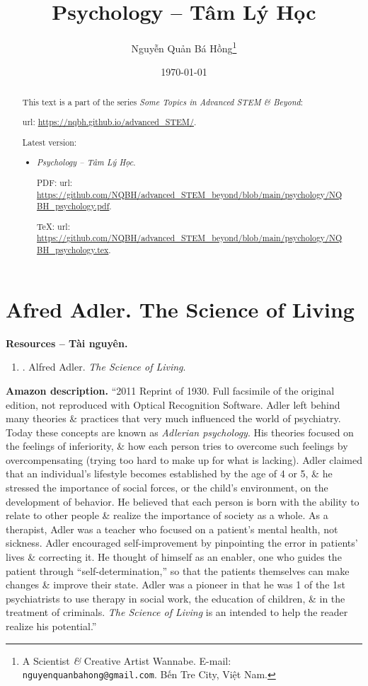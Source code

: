 \documentclass{article}
\title{Psychology -- Tâm Lý Học}
\author{Nguyễn Quản Bá Hồng\footnote{A Scientist {\it\&} Creative Artist Wannabe. E-mail: {\tt nguyenquanbahong@gmail.com}. Bến Tre City, Việt Nam.}}
\date{\today}
\begin{document}
\maketitle
\begin{abstract}
	This text is a part of the series {\it Some Topics in Advanced STEM \& Beyond}:
	
	{\sc url}: \url{https://nqbh.github.io/advanced_STEM/}.
	
	Latest version:
	\begin{itemize}
		\item {\it Psychology -- Tâm Lý Học}.
		
		PDF: {\sc url}: \url{https://github.com/NQBH/advanced_STEM_beyond/blob/main/psychology/NQBH_psychology.pdf}.
		
		\TeX: {\sc url}: \url{https://github.com/NQBH/advanced_STEM_beyond/blob/main/psychology/NQBH_psychology.tex}.
	\end{itemize}
\end{abstract}
\tableofcontents


\section{Afred Adler. The Science of Living}
\textbf{\textsf{Resources -- Tài nguyên.}}
\begin{enumerate}
	\item \cite{Adler_science_living}. {\sc Alfred Adler}. {\it The Science of Living}.
\end{enumerate}
\textbf{\textsf{Amazon description.}} ``2011 Reprint of 1930. Full facsimile of the original edition, not reproduced with Optical Recognition Software. Adler left behind many theories \& practices that very much influenced the world of psychiatry. Today these concepts are known as \textit{Adlerian psychology}. His theories focused on the feelings of inferiority, \& how each person tries to overcome such feelings by overcompensating (trying too hard to make up for what is lacking). Adler claimed that an individual's lifestyle becomes established by the age of 4 or 5, \& he stressed the importance of social forces, or the child's environment, on the development of behavior. He believed that each person is born with the ability to relate to other people \& realize the importance of society as a whole. As a therapist, Adler was a teacher who focused on a patient's mental health, not sickness. Adler encouraged self-improvement by pinpointing the error in patients' lives \& correcting it. He thought of himself as an enabler, one who guides the patient through ``self-determination,'' so that the patients themselves can make changes \& improve their state. Adler was a pioneer in that he was 1 of the 1st psychiatrists to use therapy in social work, the education of children, \& in the treatment of criminals. \textit{The Science of Living} is an intended to help the reader realize his potential.''
\end{document}
